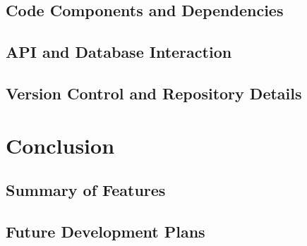\documentclass[12pt]{article}
\begin{document}
\subsection{Code Components and Dependencies}
\subsection{API and Database Interaction}
\subsection{Version Control and Repository Details}

\newpage
\section{Conclusion}
\subsection{Summary of Features}
\subsection{Future Development Plans}
\end{document}
